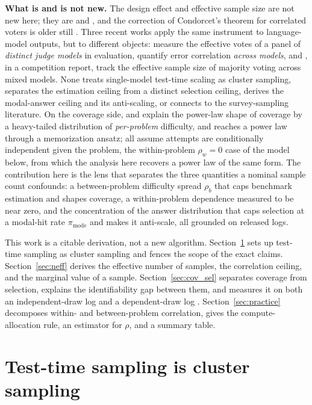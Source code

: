 \documentclass[11pt]{article}
\begin{document}
\textbf{What is and is not new.} The design effect and effective sample size are not new here; they are \citet{kish1965survey} and \citet{cochran1977sampling}, and the correction of Condorcet's theorem for correlated voters is older still \citep{ladha1992condorcet,boland1989majority}. Three recent works apply the same instrument to language-model outputs, but to different objects: \citet{kohli2026judges} measure the effective votes of a panel of \emph{distinct judge models} in evaluation, \citet{goel2025alike} quantify error correlation \emph{across models}, and \citet{nitarach2026aimo}, in a competition report, track the effective sample size of majority voting across mixed models. None treats single-model test-time scaling as cluster sampling, separates the estimation ceiling from a distinct selection ceiling, derives the modal-answer ceiling and its anti-scaling, or connects to the survey-sampling literature. On the coverage side, \citet{schaeffer2025powerlaws} and \citet{kazdan2025predicting} explain the power-law shape of coverage by a heavy-tailed distribution of \emph{per-problem} difficulty, and \citet{levi2024simplemodel} reaches a power law through a memorization ansatz; all assume attempts are conditionally independent given the problem, the within-problem $\rho_w=0$ case of the model below, from which the analysis here recovers a power law of the same form. The contribution here is the lens that separates the three quantities a nominal sample count confounds: a between-problem difficulty spread $\rho_b$ that caps benchmark estimation and shapes coverage, a within-problem dependence measured to be near zero, and the concentration of the answer distribution that caps selection at a modal-hit rate $\pi_{\mathrm{mode}}$ and makes it anti-scale, all grounded on released logs.

This work is a citable derivation, not a new algorithm. Section~\ref{sec:cluster} sets up test-time sampling as cluster sampling and fences the scope of the exact claims. Section~\ref{sec:neff} derives the effective number of samples, the correlation ceiling, and the marginal value of a sample. Section~\ref{sec:cov_sel} separates coverage from selection, explains the identifiability gap between them, and measures it on both an independent-draw log \citep{brown2024monkeys} and a dependent-draw log \citep{beeching2024scaling}. Section~\ref{sec:practice} decomposes within- and between-problem correlation, gives the compute-allocation rule, an estimator for $\rho$, and a summary table.

\section{Test-time sampling is cluster sampling}
\label{sec:cluster}
\end{document}
